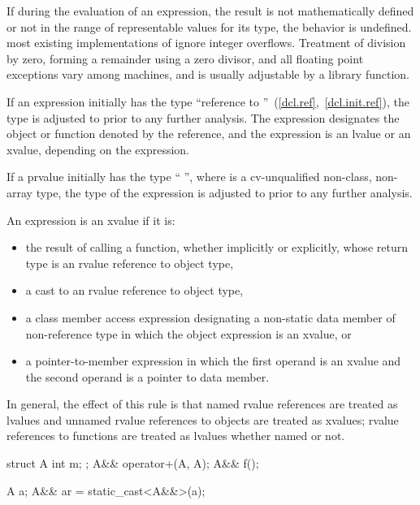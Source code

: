 \pnum
{}%
%
%
%
%
If during the evaluation of an expression, the result is not
mathematically defined or not in the range of representable values for
its type, the behavior is undefined.
\enternote 
{}%
most existing implementations of \Cpp ignore integer overflows.
Treatment of division by zero, forming a remainder using a zero divisor,
and all floating point exceptions vary among machines, and is usually
adjustable by a library function.
\exitnote 

\pnum
{}%
If an expression initially has the type ``reference to
''~(\ref{dcl.ref},~\ref{dcl.init.ref}), the type is adjusted to
 prior to any further analysis. The expression designates the
object or function denoted by the reference, and the expression
is an lvalue or an xvalue, depending on the expression.

\pnum
If a prvalue initially has the type ``\cv{} '', where
 is a cv-unqualified non-class, non-array type, the type of
the expression is adjusted to  prior to any further analysis.

\pnum
{}%
\enternote
An expression is an xvalue if it is:
\begin{itemize}
\item the result of calling a function, whether implicitly or explicitly,
whose return type is an rvalue reference to object type,

\item a cast to an rvalue reference to object type,

\item a class member access expression designating a non-static data member
of non-reference type
in which the object expression is an xvalue, or

\item a  pointer-to-member expression in which the first operand is
an xvalue and the second operand is a pointer to data member.
\end{itemize}
In general, the effect of this rule is that named rvalue references are
treated as lvalues and unnamed rvalue references to objects are treated as
xvalues; rvalue references to functions are treated as lvalues whether named or not.
\exitnote

\enterexample
\begin{codeblock}
struct A {
  int m;
};
A&& operator+(A, A);
A&& f();

A a;
A&& ar = static_cast<A&&>(a);
\end{codeblock}

